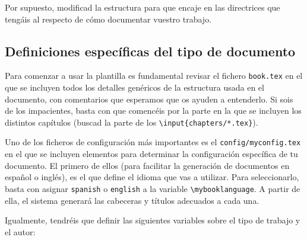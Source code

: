 Por supuesto, modificad la estructura para que encaje en las directrices
que tengáis al respecto de cómo documentar vuestro trabajo.


\subsection{Definiciones específicas del tipo de documento}
\label{sec:definicion-del-tipo}

Para comenzar a usar la plantilla es fundamental revisar el fichero
\texttt{book.tex} en el que se incluyen todos los detalles genéricos de
la estructura usada en el documento, con comentarios que esperamos que
os ayuden a entenderlo. Si sois de los impacientes, basta con que
comencéis por la parte en la que se incluyen los distintos capítulos
(buscad la parte de los \texttt{\textbackslash{}input\{chapters/*.tex\}}).

Uno de los ficheros de configuración más importantes es el
\texttt{config/myconfig.tex} en el que se incluyen elementos para
determinar la configuración específica de tu documento. El primero de
ellos (para facilitar la generación de documentos en español o inglés),
es el que define el idioma que vas a utilizar. Para seleccionarlo, basta
con asignar \texttt{spanish} o \texttt{english} a la variable
\texttt{\textbackslash{}mybooklanguage}. A partir de ella, el sistema
generará las cabeceras y títulos adecuados a cada una.

Igualmente, tendréis que definir las siguientes variables sobre el tipo
de trabajo y el autor:

